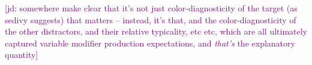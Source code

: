 \documentclass[10pt,letterpaper]{article}
\newcommand{\jd}[1]{\textcolor{Purple}{[jd: #1]}}
\begin{document}
\jd{somewhere make clear that it's not just color-diagnosticity of the target (as sedivy suggests) that matters -- instead, it's that, and the color-diagnosticity of the other distractors, and their relative typicality, etc etc, which are all ultimately captured variable modifier production expectations, and \emph{that's} the explanatory quantity}



\end{document}
